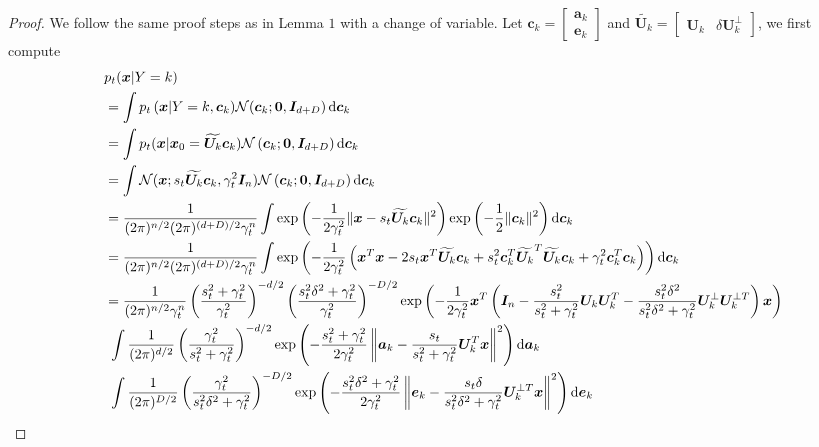 \begin{proof}
    We follow the same proof steps as in \citep{wang2024diffusion} Lemma $1$ with a change of variable. Let $\bm c_k = \begin{bmatrix}
        \bm a_k \\
        \bm e_k
    \end{bmatrix}$ and $\widetilde{\bm U_k} = \begin{bmatrix}
        \bm U_k & \delta \bm U_k^{\perp}
    \end{bmatrix}$, we first compute
    \begin{align*}
        \;\;\;& p_t(\bm x \vert Y = k) \\
        & = \int  p_t\left(\bm x \vert Y = k, \bm c_k) \mathcal{N}(\bm c_k; \bm 0, \bm I_{d+D}\right) {\rm d}\bm c_k \\
        &= \int p_t (\bm x \vert \bm x_0 = \widetilde{\bm U_k} \bm c_k) \mathcal{N}\left(\bm c_k; \bm 0, \bm I_{d + D}\right) {\rm d}\bm c_k \\
        & = \int \mathcal{N}(\bm x; s_t\widetilde{\bm U_k} \bm c_k, \gamma_t^2\bm I_n) \mathcal{N}\left(\bm c_k; \bm 0, \bm I_{d+D}\right) {\rm d}\bm c_k \\
        & = \frac{1}{(2\pi)^{n/2}(2\pi)^{(d+D)/2}\gamma_t^n} \int \exp\left(-\frac{1}{2\gamma_t^2}\|\bm x - s_t \widetilde{\bm U_k} \bm c_k\|^2 \right)\exp\left( -\frac{1}{2}\|\bm c_k\|^2 \right) {\rm d}\bm c_k \\
        & = \frac{1}{(2\pi)^{n/2}(2\pi)^{(d+D)/2}\gamma_t^n} \int \exp\left(-\frac{1}{2\gamma_t^2}\left(\bm x^T \bm x - 2s_t \bm x^T \widetilde{\bm U_k} \bm c_k + s_t^2 \bm c_k^T \widetilde{\bm U_k}^T \widetilde{\bm U_k} \bm c_k + \gamma_t^2 \bm c_k^T \bm c_k \right) \right){\rm d}\bm c_k \\
        & =  \frac{1}{(2\pi)^{n/2}\gamma_t^n}\left( \frac{s_t^2 + \gamma_t^2}{\gamma_t^2} \right)^{-d/2} \left( \frac{s_t^2 \delta^2 + \gamma_t^2}{\gamma_t^2} \right)^{-D/2}  \exp\left( -\frac{1}{2\gamma_t^2} \bm x^T\left(\bm I_n - \frac{s_t^2}{s_t^2 + \gamma_t^2} \bm U_k \bm U_k^{T} -\frac{s_t^2 \delta^2}{s_t^2\delta^2 + \gamma_t^2} \bm U_k^{\perp}\bm U_k^{\perp T} \right)\bm x \right) \\
            &\ \int \frac{1}{(2\pi)^{d/2}} \left( \frac{\gamma_t^2}{s_t^2 + \gamma_t^2} \right)^{-d/2}\exp\left(-\frac{s_t^2 + \gamma_t^2}{2\gamma_t^2}\left\|\bm a_k - \frac{s_t}{s_t^2 + \gamma_t^2}\bm U_k^{T}\bm x\right\|^2 \right) {\rm d}\bm a_k\\
            &\ \int \frac{1}{(2\pi)^{D/2}} \left( \frac{\gamma_t^2}{s_t^2\delta^2 + \gamma_t^2} \right)^{-D/2}\exp\left(-\frac{s_t^2\delta^2 + \gamma_t^2}{2\gamma_t^2}\left\|\bm e_k - \frac{s_t \delta}{s_t^2 \delta^2 + \gamma_t^2}\bm U_k^{\perp T}\bm x\right\|^2 \right) {\rm d}\bm e_k\\

\end{align*}
\end{proof}
